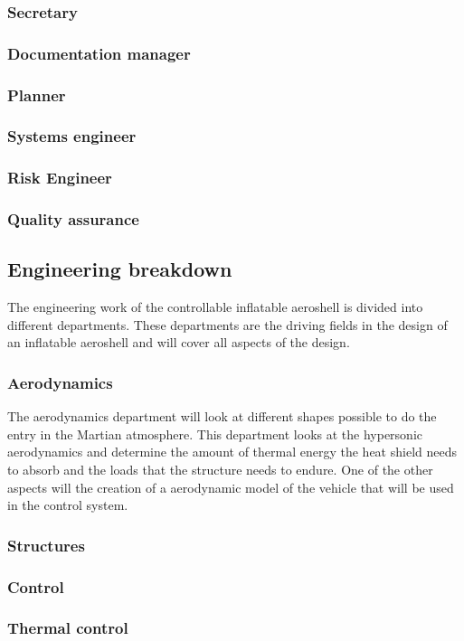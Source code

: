 \subsubsection{Secretary}\label{subsec:Secretary}


\subsubsection{Documentation manager}\label{subsec:D_and_A}


\subsubsection{Planner}\label{subsec:Planner}


\subsubsection{Systems engineer}\label{subsec:SE}


\subsubsection{Risk Engineer}\label{subsec:RiskEng}


\subsubsection{Quality assurance}\label{subsec:QA}


\subsection{Engineering breakdown}\label{subsec:engineer}
The engineering work of the controllable inflatable aeroshell is divided into different departments. These departments are the driving fields in the design of an inflatable aeroshell and will cover all aspects of the design.

\subsubsection{Aerodynamics}\label{subsec:aero}
The aerodynamics department will look at different shapes possible to do the entry in the Martian atmosphere. This department looks at the hypersonic aerodynamics and determine the amount of thermal energy the heat shield needs to absorb and the loads that the structure needs to endure. One of the other aspects will the creation of a aerodynamic model of the vehicle that will be used in the control system.

\subsubsection{Structures}\label{subsec:struct}

\subsubsection{Control}\label{subsec:control}

\subsubsection{Thermal control}\label{subsec:therm}
